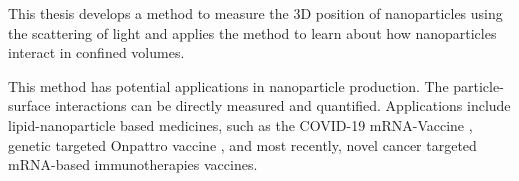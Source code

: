 This thesis develops a method to measure the 3D position of nanoparticles using the scattering of light and applies the method to learn about how nanoparticles interact in confined volumes. 

This method has potential applications in nanoparticle production. The particle-surface interactions can be directly measured and quantified. Applications include lipid-nanoparticle based medicines, such as the COVID-19 mRNA-Vaccine \cite{hou_lipid_2021}, genetic targeted Onpattro vaccine \cite{akinc_onpattro_2019}, and most recently, novel cancer targeted mRNA-based immunotherapies vaccines. \cite{noauthor_personalized_2025} 









